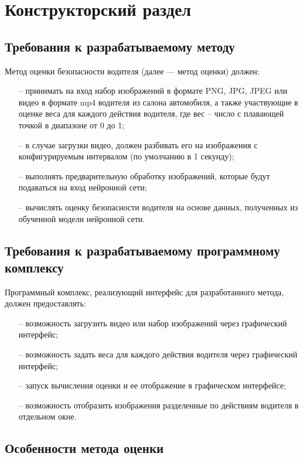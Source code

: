 \section{Конструкторский раздел}

\subsection{Требования к разрабатываемому методу}

Метод оценки безопасности водителя (далее — метод оценки) должен:
\begin{itemize}[leftmargin=1.6\parindent]
	\item[--] принимать на вход набор изображений в формате PNG, JPG, JPEG или видео в формате mp4 водителя из салона автомобиля, а также участвующие в оценке веса для каждого действия водителя, где вес -- число с плавающей точкой в диапазоне от 0 до 1;
	\item[--] в случае загрузки видео,  должен разбивать его на изображения с конфигурируемым интервалом (по умолчанию в 1 секунду);
	\item[--] выполнять предварительную обработку изображений, которые будут подаваться на вход нейронной сети;
	\item[--] вычислять оценку безопасности водителя на основе данных, полученных из обученной модели нейронной сети.
\end{itemize}

\subsection{Требования к разрабатываемому программному комплексу}
Программный комплекс, реализующий интерфейс для разработанного
метода, должен предоставлять:

\begin{itemize}[leftmargin=1.6\parindent]
	\item[--] возможность загрузить видео или набор изображений через графический интерфейс;
	\item[--] возможность задать веса для каждого действия водителя через графический интерфейс;
	\item[--] запуск вычисления оценки и ее отображение в графическом интерфейсе;
	\item[--] возможность отобразить изображения разделенные по действиям водителя в отдельном окне.
\end{itemize}

\subsection{Особенности метода оценки}
